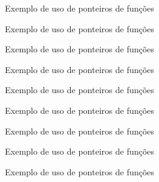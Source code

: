 \begin{frame}[fragile]{Exemplo de uso de ponteiros de funções}
\end{frame}

\begin{frame}[fragile]{Exemplo de uso de ponteiros de funções}
\end{frame}

\begin{frame}[fragile]{Exemplo de uso de ponteiros de funções}
\end{frame}

\begin{frame}[fragile]{Exemplo de uso de ponteiros de funções}
\end{frame}

\begin{frame}[fragile]{Exemplo de uso de ponteiros de funções}
\end{frame}

\begin{frame}[fragile]{Exemplo de uso de ponteiros de funções}
\end{frame}

\begin{frame}[fragile]{Exemplo de uso de ponteiros de funções}
\end{frame}

\begin{frame}[fragile]{Exemplo de uso de ponteiros de funções}
\end{frame}

\begin{frame}[fragile]{Exemplo de uso de ponteiros de funções}
\end{frame}
